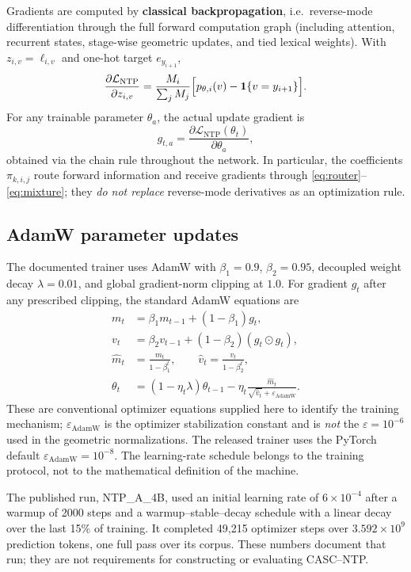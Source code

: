 \documentclass[11pt,a4paper]{article}
\newcommand{\one}{\mathbf{1}}
\begin{document}
Gradients are computed by \textbf{classical backpropagation}, i.e.\ reverse-mode differentiation through
the full forward computation graph (including attention, recurrent states, stage-wise geometric updates,
and tied lexical weights). With $z_{i,v}=\ell_{i,v}$ and one-hot target $e_{y_{i+1}}$,
\begin{equation}
\frac{\partial\mathcal L_{\mathrm{NTP}}}{\partial z_{i,v}}=\frac{M_i}{\sum_jM_j}\Bigl[p_{\theta,i}(v)-\one\{v=y_{i+1}\}\Bigr].
\end{equation}
For any trainable parameter $\theta_a$, the actual update gradient is
\begin{equation}
g_{t,a}=\frac{\partial\mathcal L_{\mathrm{NTP}}(\theta_t)}{\partial\theta_a},
\end{equation}
obtained via the chain rule throughout the network. In particular, the coefficients $\pi_{k,i,j}$ route
forward information and receive gradients through \eqref{eq:router}--\eqref{eq:mixture}; they \emph{do not
replace} reverse-mode derivatives as an optimization rule.

\subsection{AdamW parameter updates}

The documented trainer uses AdamW with $\beta_1=0.9$, $\beta_2=0.95$, decoupled weight decay
$\lambda=0.01$, and global gradient-norm clipping at $1.0$. For gradient $g_t$ after any prescribed
clipping, the standard AdamW equations are
\begin{align}
m_t&=\beta_1m_{t-1}+(1-\beta_1)g_t,\\
v_t&=\beta_2v_{t-1}+(1-\beta_2)(g_t\odot g_t),\\
\hat m_t&=\frac{m_t}{1-\beta_1^t},\qquad \hat v_t=\frac{v_t}{1-\beta_2^t},\\
\theta_t&=(1-\eta_t\lambda)\theta_{t-1}-\eta_t\frac{\hat m_t}{\sqrt{\hat v_t}+\varepsilon_{\mathrm{AdamW}}}.
\end{align}
These are conventional optimizer equations supplied here to identify the training mechanism;
$\varepsilon_{\mathrm{AdamW}}$ is the optimizer stabilization constant and is \emph{not} the
$\varepsilon=10^{-6}$ used in the geometric normalizations. The released trainer uses the PyTorch default $\varepsilon_{\mathrm{AdamW}}=10^{-8}$. The
learning-rate schedule belongs to the training protocol, not to the mathematical definition of the machine.

The published run, NTP\_A\_4B, used an initial learning rate of $6\times10^{-4}$ after a warmup of 2000
steps and a warmup--stable--decay schedule with a linear decay over the last 15\% of training. It completed
49{,}215 optimizer steps over $3.592\times10^{9}$ prediction tokens, one full pass over its corpus. These
numbers document that run; they are not requirements for constructing or evaluating CASC--NTP.
\end{document}
